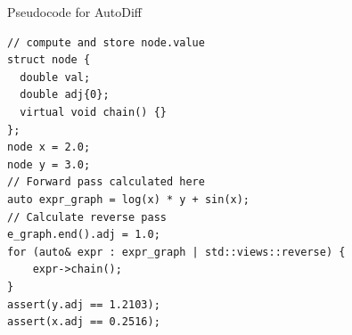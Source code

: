 \documentclass[dvipsnames, aspectratio=169]{beamer}
\makeatletter
\def\mathcolor#1#{\@mathcolor{#1}}
\def\@mathcolor#1#2#3{%
  \protect\leavevmode
  \begingroup
    \color#1{#2}#3%
  \endgroup
}
\makeatother
\begin{document}
\begin{frame}[fragile]{Pseudocode for AutoDiff}
\begin{verbatim}
// compute and store node.value
struct node {
  double val;
  double adj{0};
  virtual void chain() {}
};
node x = 2.0;
node y = 3.0;
// Forward pass calculated here
auto expr_graph = log(x) * y + sin(x);
// Calculate reverse pass
e_graph.end().adj = 1.0;
for (auto& expr : expr_graph | std::views::reverse) {
    expr->chain();
}
assert(y.adj == 1.2103);
assert(x.adj == 0.2516);
\end{verbatim}
\end{frame}

\end{document}
